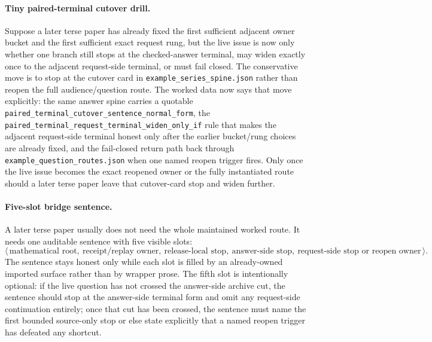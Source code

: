 \documentclass[11pt]{article}
\begin{document}
\paragraph{Tiny paired-terminal cutover drill.}
Suppose a later terse paper has already fixed the first sufficient adjacent owner bucket and the first sufficient exact request rung, but the live issue is now only whether one branch still stops at the checked-answer terminal, may widen exactly once to the adjacent request-side terminal, or must fail closed. The conservative move is to stop at the cutover card in \nolinkurl{example\_series\_spine.json} rather than reopen the full audience/question route. The worked data now says that move explicitly: the same answer spine carries a quotable \texttt{paired\_terminal\_cutover\_sentence\_normal\_form}, the \texttt{paired\_terminal\_request\_terminal\_widen\_only\_if} rule that makes the adjacent request-side terminal honest only after the earlier bucket/rung choices are already fixed, and the fail-closed return path back through \texttt{example\_question\_routes.json} when one named reopen trigger fires. Only once the live issue becomes the exact reopened owner or the fully instantiated route should a later terse paper leave that cutover-card stop and widen further.\cite{series:workedexample,series:pairedterminalcutoverrules}

\paragraph{Five-slot bridge sentence.}
A later terse paper usually does not need the whole maintained worked route. It needs one auditable sentence with five visible slots:
\[
\langle\,\text{mathematical root},\ \text{receipt/replay owner},\ \text{release-local stop},\ \text{answer-side stop},\ \text{request-side stop or reopen owner}\,\rangle.
\]
The sentence stays honest only while each slot is filled by an already-owned imported surface rather than by wrapper prose. The fifth slot is intentionally optional: if the live question has not crossed the answer-side archive cut, the sentence should stop at the answer-side terminal form and omit any request-side continuation entirely; once that cut has been crossed, the sentence must name the first bounded source-only stop or else state explicitly that a named reopen trigger has defeated any shortcut.
\end{document}

